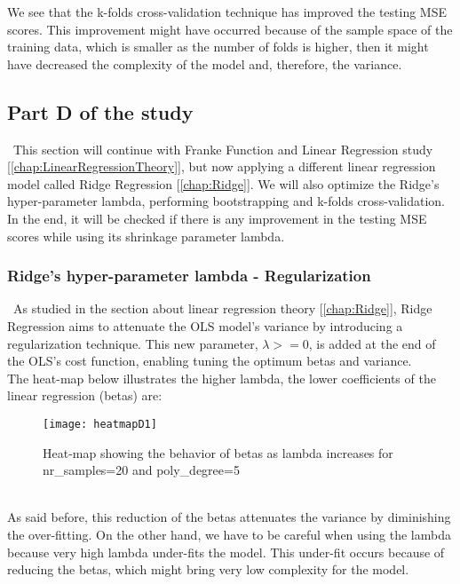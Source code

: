 We see that the k-folds cross-validation technique has improved the testing MSE scores. This improvement might have occurred because of the sample space of the training data, which is smaller as the number of folds is higher, then it might have decreased the complexity of the model and, therefore, the variance. \\

\subsection{Part D of the study}
\label{chap:Part D of the study}

\quad \, This section will continue with Franke Function and Linear Regression study [\autoref{chap:LinearRegressionTheory}], but now applying a different linear regression model called Ridge Regression [\autoref{chap:Ridge}]. We will also optimize the Ridge's hyper-parameter lambda, performing bootstrapping and k-folds cross-validation. In the end, it will be checked if there is any improvement in the testing MSE scores while using its shrinkage parameter lambda. \\

\subsubsection{Ridge's hyper-parameter lambda - Regularization}
\label{chap:Ridge's hyper-parameter lambda - Regularization}

\quad \, As studied in the section about linear regression theory [\autoref{chap:Ridge}], Ridge Regression aims to attenuate the OLS model's variance by introducing a regularization technique. This new parameter, $\lambda >= 0$, is added at the end of the OLS's cost function, enabling tuning the optimum betas and variance. \\

The heat-map below illustrates the higher lambda, the lower coefficients of the linear regression (betas) are: \\

\begin{figure}[H]
\label{fig:heatmapD1}
\centering
\texttt{[image: heatmapD1]}
\caption{Heat-map showing the behavior of betas as lambda increases for nr\_samples=20 and poly\_degree=5}
\end{figure} \\

As said before, this reduction of the betas attenuates the variance by diminishing the over-fitting. On the other hand, we have to be careful when using the lambda because very high lambda under-fits the model. This under-fit occurs because of reducing the betas, which might bring very low complexity for the model. \\

